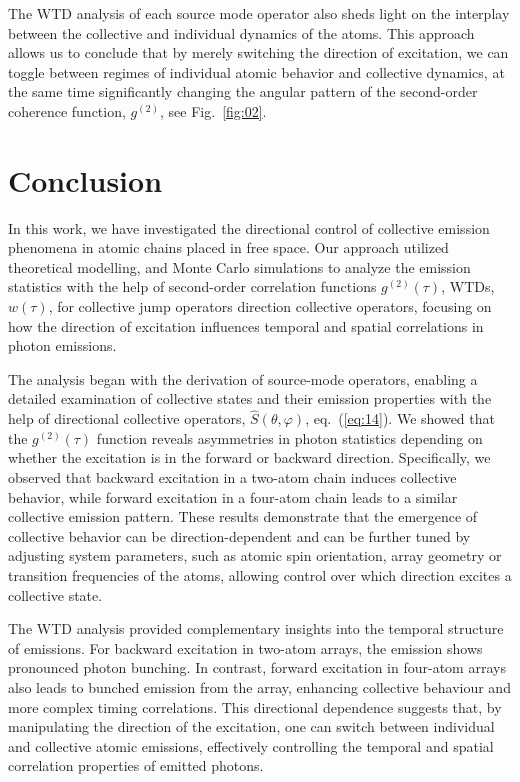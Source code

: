 \documentclass[aps,prl,twocolumn,superscriptaddress,showpacs,amsmath,amssymb]{revtex4-2}
\begin{document}
The WTD analysis of each source mode operator also sheds light on the interplay between the collective and individual dynamics of the atoms. This approach allows us to conclude that by merely switching the direction of excitation, we can toggle between regimes of individual atomic behavior and collective dynamics, at the same time significantly changing the angular pattern of the second-order coherence function, $g^{(2)}$, see Fig.~\ref{fig:02}.



\section{Conclusion}\label{sec:conclusion}

In this work, we have investigated the directional control of collective emission phenomena in atomic chains placed in free space.
Our approach utilized theoretical modelling, and Monte Carlo simulations to analyze the emission statistics with the help of second-order correlation functions $g^{(2)}(\tau)$, WTDs, $w(\tau)$, for collective jump operators direction collective operators, focusing on how the direction of excitation influences temporal and spatial correlations in photon emissions.

The analysis began with the derivation of source-mode operators, enabling a detailed examination of collective states and their emission properties with the help of directional collective operators, $\hat{S}(\theta, \varphi)$, eq.~(\ref{eq:14}). 
We showed that the $g^{(2)}(\tau)$ function reveals asymmetries in photon statistics depending on whether the excitation is in the forward or backward direction. 
Specifically, we observed that backward excitation in a two-atom chain induces collective behavior, while forward excitation in a four-atom chain leads to a similar collective emission pattern. 
These results demonstrate that the emergence of collective behavior can be direction-dependent and can be further tuned by adjusting system parameters, such as atomic spin orientation, array geometry or transition frequencies of the atoms, allowing control over which direction excites a collective state.

The WTD analysis provided complementary insights into the temporal structure of emissions. 
For backward excitation in two-atom arrays, the emission shows pronounced photon bunching. In contrast, forward excitation in four-atom arrays also leads to bunched emission from the array, enhancing collective behaviour and more complex timing correlations. 
This directional dependence suggests that, by manipulating the direction of the excitation, one can switch between individual and collective atomic emissions, effectively controlling the temporal and spatial correlation properties of emitted photons.
\end{document}
